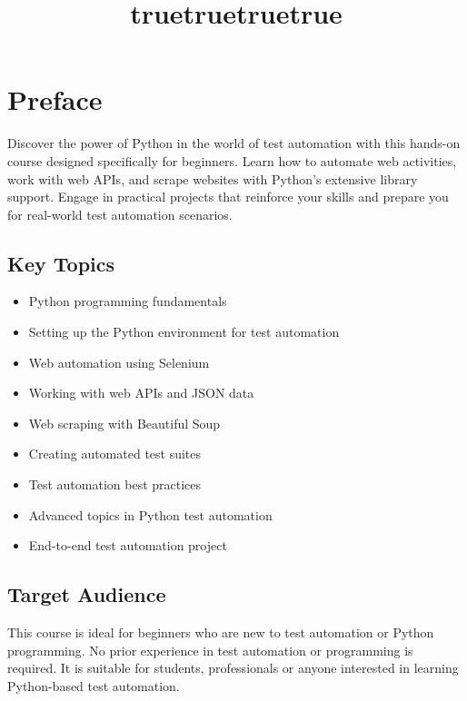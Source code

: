 \documentclass[
  paper=a4,
  ,captions=tableheading
]{scrartcl}
\title{truetrue}
\author{}
\date{}
\title{truetrue}
\author{}
\date{}
\providecommand{\tightlist}{%
  \setlength{\itemsep}{0pt}\setlength{\parskip}{0pt}}
\begin{document}




{
\setcounter{tocdepth}{2}
\tableofcontents
}
\hypertarget{preface}{%
\chapter{Preface}\label{preface}}

Discover the power of Python in the world of test automation with this
hands-on course designed specifically for beginners. Learn how to
automate web activities, work with web APIs, and scrape websites with
Python's extensive library support. Engage in practical projects that
reinforce your skills and prepare you for real-world test automation
scenarios.

\hypertarget{key-topics}{%
\section{Key Topics}\label{key-topics}}

\begin{itemize}
\tightlist
\item
  Python programming fundamentals
\item
  Setting up the Python environment for test automation
\item
  Web automation using Selenium
\item
  Working with web APIs and JSON data
\item
  Web scraping with Beautiful Soup
\item
  Creating automated test suites
\item
  Test automation best practices
\item
  Advanced topics in Python test automation
\item
  End-to-end test automation project
\end{itemize}

\hypertarget{target-audience}{%
\section{Target Audience}\label{target-audience}}

This course is ideal for beginners who are new to test automation or
Python programming. No prior experience in test automation or
programming is required. It is suitable for students, professionals or
anyone interested in learning Python-based test automation.
\end{document}
